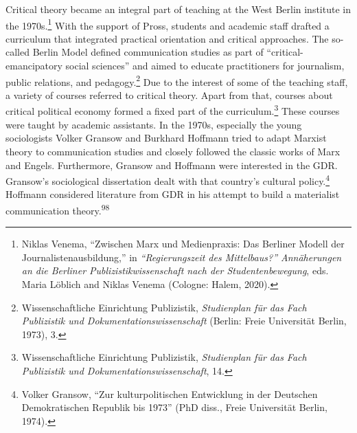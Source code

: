 \documentclass{tufte-handout}
\begin{document}
Critical theory became an integral part of teaching at the West Berlin
institute in the 1970s.\footnote{Niklas Venema, ``Zwischen Marx und
  Medienpraxis: Das Berliner Modell der Journalistenausbildung,'' in
  \emph{``Regierungszeit des Mittelbaus?'' Annäherungen an die Berliner
  Publizistikwissenschaft nach der Studentenbewegung}, eds. Maria
  Löblich and Niklas Venema (Cologne: Halem, 2020).} With the support of
Pross, students and academic staff drafted a curriculum that integrated
practical orientation and critical approaches. The so-called Berlin
Model defined communication studies as part of ``critical-emancipatory
social sciences'' and aimed to educate practitioners for journalism,
public relations, and pedagogy.\footnote{Wissenschaftliche Einrichtung
  Publizistik, \emph{Studienplan für das Fach Publizistik und
  Dokumentationswissenschaft} (Berlin: Freie Universität Berlin, 1973),
  3.} Due to the interest of some of the teaching staff, a variety of
courses referred to critical theory. Apart from that, courses about
critical political economy formed a fixed part of the
curriculum.\footnote{Wissenschaftliche Einrichtung Publizistik,
  \emph{Studienplan für das Fach Publizistik und
  Dokumentationswissenschaft}, 14.} These courses were taught by
academic assistants. In the 1970s, especially the young sociologists
Volker Gransow and Burkhard Hoffmann tried to adapt Marxist theory to
communication studies and closely followed the classic works of Marx and
Engels. Furthermore, Gransow and Hoffmann were interested in the GDR.
Gransow's sociological dissertation dealt with that country's cultural
policy.\footnote{Volker Gransow, ``Zur kulturpolitischen Entwicklung in
  der Deutschen Demokratischen Republik bis 1973'' (PhD diss., Freie
  Universität Berlin, 1974).} Hoffmann considered literature from GDR in
his attempt to build a materialist communication theory.\textsuperscript{98}
\end{document}
